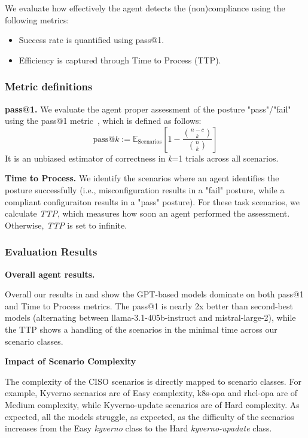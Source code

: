 We evaluate how effectively the agent detects the (non)compliance using the following metrics:
\begin{itemize}[left=0pt, topsep=0pt, partopsep=0pt, itemsep=0pt, parsep=0pt]
    \item Success rate is quantified using pass@1.
    \item Efficiency is captured through Time to Process (TTP).
\end{itemize}

\subsubsection{Metric definitions}

\textbf{pass@1.}
We evaluate the agent proper assessment of the posture "pass"/"fail" using the pass@1 metric~\cite{chen2021evaluating}, which is defined as follows:
$$\text{pass@}k := \mathbb{E}_{\text{Scenarios}}\left[1 - \frac{\binom{n-c}{k}}{\binom{n}{k}}\right] $$
It is an unbiased estimator of correctness in \textit{k}=1 trials across all scenarios. 

\textbf{Time to Process.}
We identify the scenarios where an agent identifies the posture  successfully (i.e., misconfiguration results in a "fail" posture, while a compliant configuraiton results in a "pass" posture). For these task scenarios, we calculate \textit{TTP}, which measures how soon an agent performed the assessment. Otherwise, \textit{TTP} is set to infinite. 

\subsubsection{Evaluation Results}

\textbf{Overall agent results.}

Overall our results in  and  show the GPT-based models dominate on both pass@1 and Time to Process metrics. The pass@1 is nearly 2x better than second-best models (alternating between llama-3.1-405b-instruct and mistral-large-2), while the TTP shows a handling of the scenarios in the minimal time across our scenario classes.

\textbf{Impact of Scenario Complexity}

The complexity of the CISO scenarios is directly mapped to scenario classes. For example, Kyverno scenarios are of Easy complexity, k8s-opa and rhel-opa are of Medium complexity, while Kyverno-update scenarios are of Hard complexity. 
As expected, all the models struggle, as expected, as the difficulty of the scenarios increases from the Easy \textit{kyverno} class to the Hard \textit{kyverno-upadate} class. 

